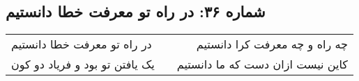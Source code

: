 \begin{center}
\section*{شماره ۳۶: در راه تو معرفت خطا دانستیم}
\label{sec:036}
\begin{longtable}{l p{0.5cm} r}
در راه تو معرفت خطا دانستیم
&&
چه راه و چه معرفت کرا دانستیم
\\
یک یافتن تو بود و فریاد دو کون
&&
کاین نیست ازان دست که ما دانستیم
\\
\end{longtable}
\end{center}
